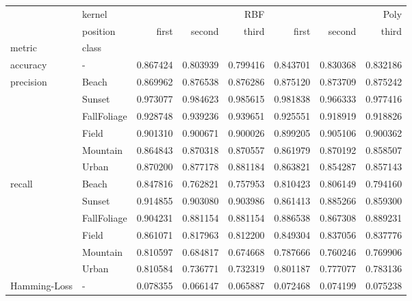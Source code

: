 \begin{tabular}{llrrrrrr}
\toprule
 & kernel & \multicolumn{3}{r}{RBF} & \multicolumn{3}{r}{Poly} \\
 & position & first & second & third & first & second & third \\
metric & class &  &  &  &  &  &  \\
\midrule
accuracy & - & 0.867424 & 0.803939 & 0.799416 & 0.843701 & 0.830368 & 0.832186 \\
\cline{1-8}
\multirow[t]{6}{*}{precision} & Beach & 0.869962 & 0.876538 & 0.876286 & 0.875120 & 0.873709 & 0.875242 \\
 & Sunset & 0.973077 & 0.984623 & 0.985615 & 0.981838 & 0.966333 & 0.977416 \\
 & FallFoliage & 0.928748 & 0.939236 & 0.939651 & 0.925551 & 0.918919 & 0.918826 \\
 & Field & 0.901310 & 0.900671 & 0.900026 & 0.899205 & 0.905106 & 0.900362 \\
 & Mountain & 0.864843 & 0.870318 & 0.870557 & 0.861979 & 0.870192 & 0.858507 \\
 & Urban & 0.870200 & 0.877178 & 0.881184 & 0.863821 & 0.854287 & 0.857143 \\
\cline{1-8}
\multirow[t]{6}{*}{recall} & Beach & 0.847816 & 0.762821 & 0.757953 & 0.810423 & 0.806149 & 0.794160 \\
 & Sunset & 0.914855 & 0.903080 & 0.903986 & 0.861413 & 0.885266 & 0.859300 \\
 & FallFoliage & 0.904231 & 0.881154 & 0.881154 & 0.886538 & 0.867308 & 0.889231 \\
 & Field & 0.861071 & 0.817963 & 0.812200 & 0.849304 & 0.837056 & 0.837776 \\
 & Mountain & 0.810597 & 0.684817 & 0.674668 & 0.787666 & 0.760246 & 0.769906 \\
 & Urban & 0.810584 & 0.736771 & 0.732319 & 0.801187 & 0.777077 & 0.783136 \\
\cline{1-8}
Hamming-Loss & - & 0.078355 & 0.066147 & 0.065887 & 0.072468 & 0.074199 & 0.075238 \\
\cline{1-8}
\bottomrule
\end{tabular}
